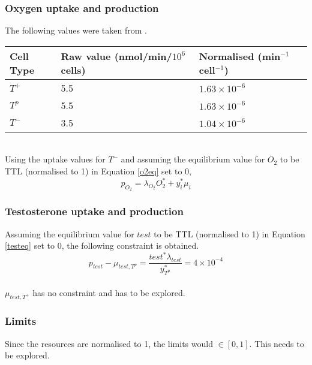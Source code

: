 \subsubsection{Oxygen uptake and production}
The following values were taken from \cite{HailJr}.
\begin{table}[h]
\centering
\begin{tabular}{|l|l|l|}
  \hline
  Cell Type & Raw value (nmol/min/$10^6$ cells) & Normalised (min$^{-1}$cell$^{-1}$) \\
  \hline
  $T^+$     & 5.5                               & $1.63 \times 10^{-6}$              \\
  $T^p$     & 5.5                               & $1.63 \times 10^{-6}$              \\
  $T^-$     & 3.5                               & $1.04 \times 10^{-6}$              \\
  \hline
\end{tabular}
\end{table}
\\Using the uptake values for $T^-$ and assuming the equilibrium value for $O_2$ to be TTL (normalised to 1) in Equation \ref{o2eq} set to 0,
\begin{equation}
  p_{O_2} = \lambda_{O_2} O_2^* + y_i^* \mu_i
\end{equation}
\subsubsection{Testosterone uptake and production}
Assuming the equilibrium value for $test$ to be TTL (normalised to 1) in Equation \ref{testeq} set to 0, the following constraint is obtained.
\begin{equation}
  p_{test} - \mu_{test,T^p} = \frac{test^* \lambda_{test}}{y_{T^p}^*} = 4 \times 10^{-4}
\end{equation}
\\$\mu_{test,T^+}$ has no constraint and has to be explored.
\subsubsection{Limits}
Since the resources are normalised to 1, the limits would $\in [0,1]$. This needs to be explored.
